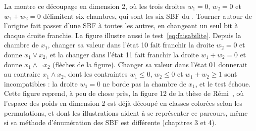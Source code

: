 \documentclass[12pt, a4paper]{article}
\begin{document}
La  montre ce découpage en dimension 2, où les trois droites $w_1 = 0$, $w_2 = 0$ et $w_1 + w_2 = 0$ délimitent six chambres, qui sont les six SBF du .
Tourner autour de l'origine fait passer d'une SBF à toutes les autres, en changeant un seul bit à chaque droite franchie.
La figure illustre aussi le test~\eqref{eq:faisabilite}.
Depuis la chambre de $x_1$, changer sa valeur dans l'état 10 fait franchir la droite $w_2 = 0$ et donne $x_1 \vee x_2$, et la changer dans l'état 11 fait franchir la droite $w_1 + w_2 = 0$ et donne $x_1 \wedge \neg x_2$ (flèches de la figure).
Changer sa valeur dans l'état 01 donnerait au contraire $x_1 \wedge x_2$, dont les contraintes $w_1 \le 0$, $w_2 \le 0$ et $w_1 + w_2 \ge 1$ sont incompatibles : la droite $w_1 = 0$ ne borde pas la chambre de $x_1$, et le test échoue.
Cette figure reprend, à peu de chose près, la figure 12 de la thèse de Rémi~\cite{segretain2023}, où l'espace des poids en dimension 2 est déjà découpé en classes colorées selon les permutations, et dont les illustrations aident à se représenter ce parcours, même si sa méthode d'énumération des SBF est différente (chapitres 3 et 4).
\end{document}
